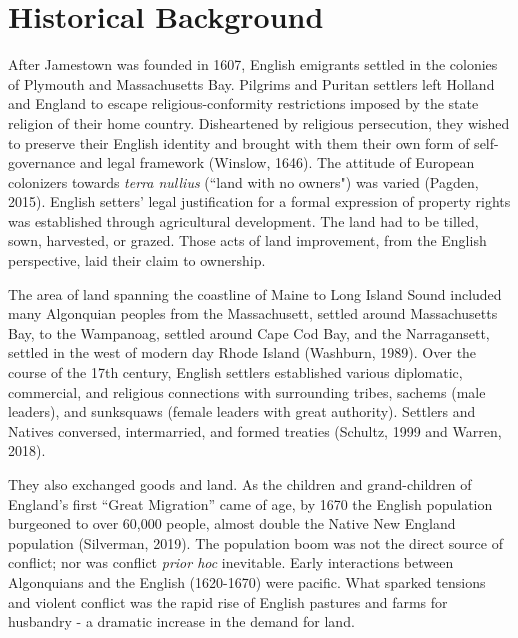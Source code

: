 \documentclass[sn-mathphys]{sn-jnl}%
\theoremstyle{thmstyleone}%
\theoremstyle{thmstyletwo}%
\theoremstyle{thmstylethree}%
\begin{document}
\section{Historical Background}\label{sec2}

After Jamestown was founded in 1607, English emigrants settled in the colonies of Plymouth and Massachusetts Bay. Pilgrims and Puritan settlers left Holland and England to escape religious-conformity restrictions imposed by the state religion of their home country. Disheartened by religious persecution, they wished to preserve their English identity and brought with them their own form of self-governance and legal framework (Winslow, 1646). The attitude of European colonizers towards {\em terra nullius} (``land with no owners") was varied (Pagden, 2015). 
English setters' legal justification for a formal expression of property rights was established through agricultural development. The land had to be tilled, sown, harvested, or grazed. Those acts of land improvement, from the English perspective, laid their claim to ownership.

The area of land spanning the coastline of Maine to Long Island Sound included many Algonquian peoples from the Massachusett, settled around Massachusetts Bay, to the Wampanoag, settled around Cape Cod Bay, and the Narragansett, settled in the west of modern day Rhode Island (Washburn, 1989). Over the course of the 17th century, English settlers established various diplomatic, commercial, and religious connections with surrounding tribes, sachems (male leaders), and sunksquaws (female leaders with great authority). Settlers and Natives conversed, intermarried, and formed treaties (Schultz, 1999 and Warren, 2018). 

They also exchanged goods and land. As the children and grand-children of England's first ``Great Migration'' came of age, by 1670 the English population burgeoned to over 60,000 people, almost double the Native New England population (Silverman, 2019). The population boom was not the direct source of conflict; nor was conflict {\em prior hoc} inevitable. Early interactions between Algonquians and the English (1620-1670) were pacific. What sparked tensions and violent conflict was the rapid rise of English pastures and farms for husbandry - a dramatic increase in the demand for land. 
\end{document}
